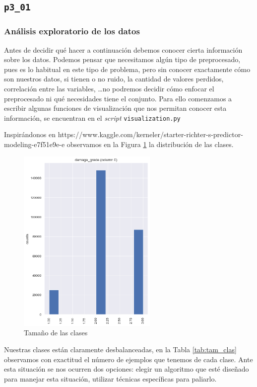 \documentclass[a4paper, 20pt]{article}
\begin{document}
\subsection{\texttt{p3\_01}}
\subsubsection{Análisis exploratorio de los datos}

Antes de decidir qué hacer a continuación debemos conocer cierta información sobre los datos. Podemos pensar que necesitamos algún tipo de preprocesado, pues es lo habitual en este tipo de problema, pero sin conocer exactamente cómo son nuestros datos, si tienen o no ruido, la cantidad de valores perdidos, correlación entre las variables, \dots no podremos decidir cómo enfocar el preprocesado ni qué necesidades tiene el conjunto. Para ello comenzamos a escribir algunas funciones de visualización que nos permitan conocer esta información, se encuentran en el \textit{script} \texttt{visualization.py}

Inspirándonos en 
https://www.kaggle.com/kerneler/starter-richter-s-predictor-modeling-e7f51e9e-e
observamos en la Figura \ref{fig:tam_clases} la distribución de las clases.

\begin{figure}[H]
    \centering
    \includegraphics[height=0.6\textwidth, width=0.6\textwidth]{260601_dist}
    \caption{Tamaño de las clases}
    \label{fig:tam_clases}
\end{figure}

Nuestras clases están claramente desbalanceadas, en la Tabla \ref{tab:tam_clas} observamos con exactitud el número de ejemplos que tenemos de cada clase. Ante esta situación se nos ocurren dos opciones: elegir un algoritmo que esté diseñado para manejar esta situación, utilizar técnicas específicas para paliarlo.
\end{document}
